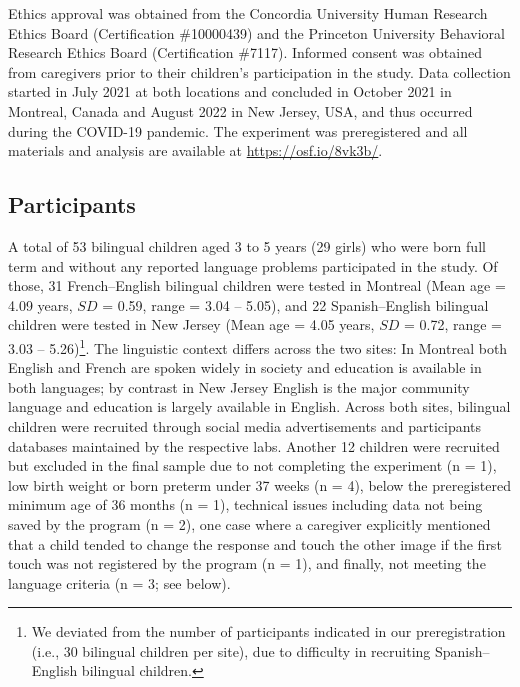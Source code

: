 \documentclass[
  man,floatsintext]{apa7}
\begin{document}
Ethics approval was obtained from the Concordia University Human Research Ethics Board (Certification \#10000439) and the Princeton University Behavioral Research Ethics Board (Certification \#7117). Informed consent was obtained from caregivers prior to their children's participation in the study. Data collection started in July 2021 at both locations and concluded in October 2021 in Montreal, Canada and August 2022 in New Jersey, USA, and thus occurred during the COVID-19 pandemic. The experiment was preregistered and all materials and analysis are available at \url{https://osf.io/8vk3b/}.

\hypertarget{participants}{%
\subsection{Participants}\label{participants}}

A total of 53 bilingual children aged 3 to 5 years (29 girls) who were born full term and without any reported language problems participated in the study. Of those, 31 French--English bilingual children were tested in Montreal (Mean age = 4.09 years, \(SD\) = 0.59, range = 3.04 -- 5.05), and 22 Spanish--English bilingual children were tested in New Jersey (Mean age = 4.05 years, \(SD\) = 0.72, range = 3.03 -- 5.26)\footnote{We deviated from the number of participants indicated in our preregistration (i.e., 30 bilingual children per site), due to difficulty in recruiting Spanish--English bilingual children.}. The linguistic context differs across the two sites: In Montreal both English and French are spoken widely in society and education is available in both languages; by contrast in New Jersey English is the major community language and education is largely available in English. Across both sites, bilingual children were recruited through social media advertisements and participants databases maintained by the respective labs. Another 12 children were recruited but excluded in the final sample due to not completing the experiment (n = 1), low birth weight or born preterm under 37 weeks (n = 4), below the preregistered minimum age of 36 months (n = 1), technical issues including data not being saved by the program (n = 2), one case where a caregiver explicitly mentioned that a child tended to change the response and touch the other image if the first touch was not registered by the program (n = 1), and finally, not meeting the language criteria (n = 3; see below).
\end{document}
